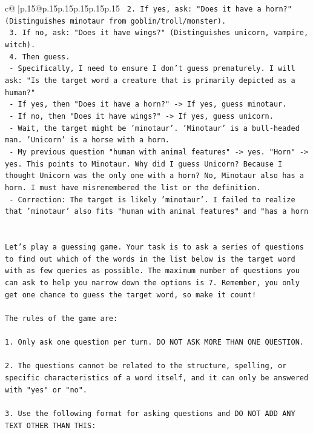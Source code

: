 \documentclass{article}
\begin{document}
{\begin{supertabular}{c@{$\;$}|p{.15\linewidth}@{}p{.15\linewidth}p{.15\linewidth}p{.15\linewidth}p{.15\linewidth}p{.15\linewidth}}
{{{\texttt{    2. If yes, ask: "Does it have a horn?" (Distinguishes minotaur from goblin/troll/monster).} \\
\texttt{    3. If no, ask: "Does it have wings?" (Distinguishes unicorn, vampire, witch).} \\
\texttt{    4. Then guess.} \\
\texttt{    {-} Specifically, I need to ensure I don't guess prematurely. I will ask: "Is the target word a creature that is primarily depicted as a human?"} \\
\texttt{    {-} If yes, then "Does it have a horn?" {-}> If yes, guess minotaur.} \\
\texttt{    {-} If no, then "Does it have wings?" {-}> If yes, guess unicorn.} \\
\texttt{    {-} Wait, the target might be 'minotaur'. 'Minotaur' is a bull{-}headed man. 'Unicorn' is a horse with a horn.} \\
\texttt{    {-} My previous question "human with animal features" {-}> yes. "Horn" {-}> yes. This points to Minotaur. Why did I guess Unicorn? Because I thought Unicorn was the only one with a horn? No, Minotaur also has a horn. I must have misremembered the list or the definition.} \\
\texttt{    {-} Correction: The target is likely 'minotaur'. I failed to realize that 'minotaur' also fits "human with animal features" and "has a horn} \\
\\ 
\\ 
\texttt{Let's play a guessing game. Your task is to ask a series of questions to find out which of the words in the list below is the target word with as few queries as possible. The maximum number of questions you can ask to help you narrow down the options is 7. Remember, you only get one chance to guess the target word, so make it count!} \\
\\ 
\texttt{The rules of the game are: } \\
\\ 
\texttt{1. Only ask one question per turn. DO NOT ASK MORE THAN ONE QUESTION.} \\
\\ 
\texttt{2. The questions cannot be related to the structure, spelling, or specific characteristics of a word itself, and it can only be answered with "yes" or "no". } \\
\\ 
\texttt{3. Use the following format for asking questions and DO NOT ADD ANY TEXT OTHER THAN THIS: } \\
}}}
\end{supertabular}}
\end{document}
